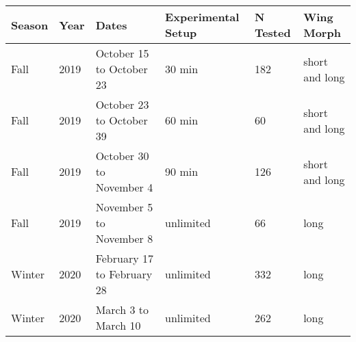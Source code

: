 \begin{table}[]
\begin{tabular}{@{}llllll@{}}
\toprule
Season & Year & Dates                      & Experimental Setup & N Tested & Wing Morph     \\ \midrule
\rowcolor[HTML]{f5f5f5}
Fall   & 2019 & October 15 to October 23   & 30 min             & 182      & short and long \\
Fall   & 2019 & October 23 to October 39   & 60 min             & 60       & short and long \\
\rowcolor[HTML]{f5f5f5}
Fall   & 2019 & October 30 to November 4   & 90 min             & 126      & short and long \\
Fall   & 2019 & November 5 to November 8   & unlimited          & 66       & long           \\
\rowcolor[HTML]{f5f5f5}
Winter & 2020 & February 17 to February 28 & unlimited          & 332      & long           \\
Winter & 2020 & March 3 to March 10        & unlimited          & 262      & long           \\ \bottomrule
\end{tabular}
\end{table}